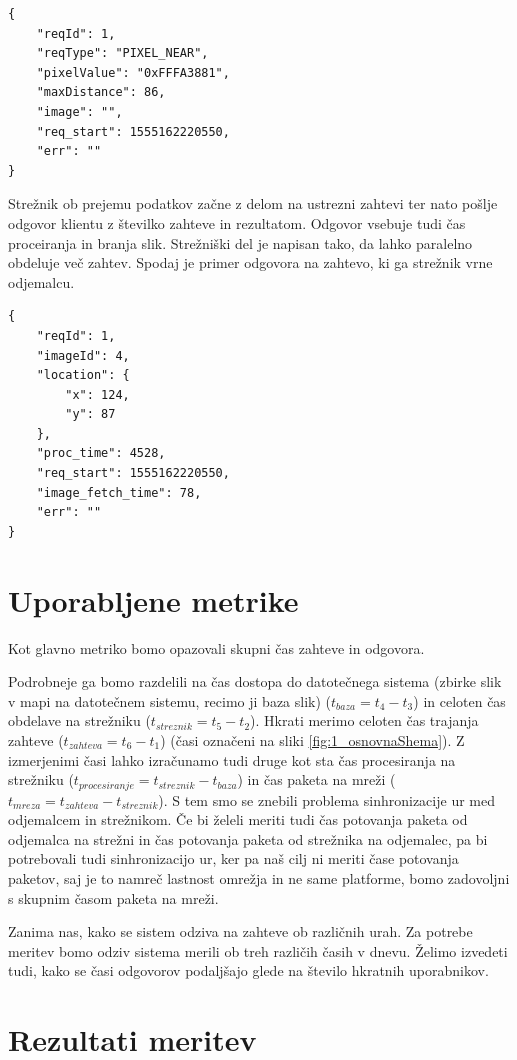 \begin{lstlisting}
{
	"reqId": 1,
	"reqType": "PIXEL_NEAR",
	"pixelValue": "0xFFFA3881",
	"maxDistance": 86,
	"image": "",
	"req_start": 1555162220550,
	"err": ""
}
\end{lstlisting}

Strežnik ob prejemu podatkov začne z delom na ustrezni zahtevi ter nato pošlje odgovor klientu z številko zahteve in rezultatom. Odgovor vsebuje tudi čas proceiranja in branja slik. Strežniški del je napisan tako, da lahko paralelno obdeluje več zahtev. Spodaj je primer odgovora na zahtevo, ki ga strežnik vrne odjemalcu.

\begin{lstlisting}
{
	"reqId": 1,
	"imageId": 4,
	"location": {
		"x": 124,
		"y": 87	
	},
	"proc_time": 4528,
	"req_start": 1555162220550,
	"image_fetch_time": 78,
	"err": ""
}
\end{lstlisting}

\section{Uporabljene metrike}

Kot glavno metriko bomo opazovali skupni čas zahteve in odgovora.

Podrobneje ga bomo razdelili na čas dostopa do datotečnega sistema (zbirke slik v mapi na datotečnem sistemu, recimo ji baza slik) ($t_{baza} = t_4 - t_3$) in celoten čas obdelave na strežniku ($t_{streznik} = t_5 - t_2$). Hkrati merimo celoten čas trajanja zahteve ($t_{zahteva} = t_6 - t_1$) (časi označeni na sliki \ref{fig:1_osnovnaShema}). Z izmerjenimi časi lahko izračunamo tudi druge kot sta čas procesiranja na strežniku ($t_{procesiranje} = t_{streznik} - t_{baza}$) in čas paketa na mreži ($t_{mreza} = t_{zahteva} - t_{streznik}$). S tem smo se znebili problema sinhronizacije ur med odjemalcem in strežnikom. Če bi želeli meriti tudi čas potovanja paketa od odjemalca na strežni in čas potovanja paketa od strežnika na odjemalec, pa bi potrebovali tudi sinhronizacijo ur, ker pa naš cilj ni meriti čase potovanja paketov, saj je to namreč lastnost omrežja in ne same platforme, bomo zadovoljni s skupnim časom paketa na mreži.

Zanima nas, kako se sistem odziva na zahteve ob različnih urah. Za potrebe meritev bomo odziv sistema merili ob treh različih časih v dnevu. Želimo izvedeti tudi, kako se časi odgovorov podaljšajo glede na število hkratnih uporabnikov.

\section{Rezultati meritev} %

